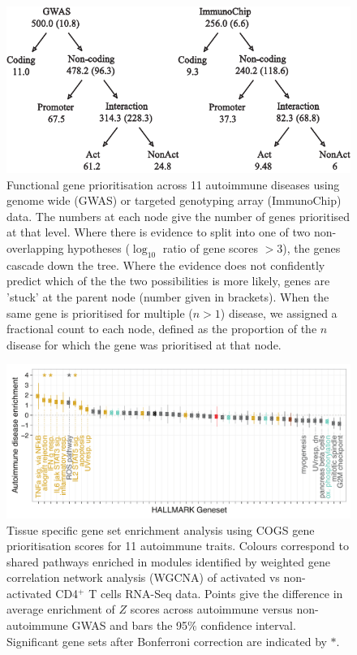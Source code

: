 \documentclass[a4paper,11pt]{report}
\begin{document}
\begin{figure}[h]
\includegraphics[width=\textwidth]{ai_cogs.pdf}
\caption{Functional gene prioritisation across 11 autoimmune diseases using genome wide (GWAS) or targeted genotyping array (ImmunoChip) data. The numbers at each node give the number of genes prioritised at that level. Where there is evidence to split into one of two non-overlapping hypotheses ($\log_{10}$ ratio of gene scores $>$3), the genes cascade down the tree. Where the evidence does not confidently predict which of the the two possibilities is more likely, genes are 'stuck' at the parent node (number given in brackets). When the same gene is prioritised for multiple ($n>1$) disease, we assigned a fractional count to each node, defined as the proportion of the $n$ disease for which the gene was prioritised at that node.}
\label{fig:cogs_ai}
\end{figure}

\begin{figure}[h]
\includegraphics[width=\textwidth]{hallmark_enrichment.pdf}
\caption{Tissue specific gene set enrichment analysis using COGS gene prioritisation scores for 11 autoimmune traits. Colours correspond to shared pathways enriched in modules identified by weighted gene correlation network analysis (WGCNA) of activated vs non-activated CD4$^{+}$ T cells RNA-Seq data. Points give the difference in average enrichment of $Z$ scores across autoimmune versus non-autoimmune GWAS and bars the 95$\%$ confidence interval. Significant gene sets after Bonferroni correction are indicated by $*$.}
\label{fig:hallmark} 
\end{figure}
\end{document}
